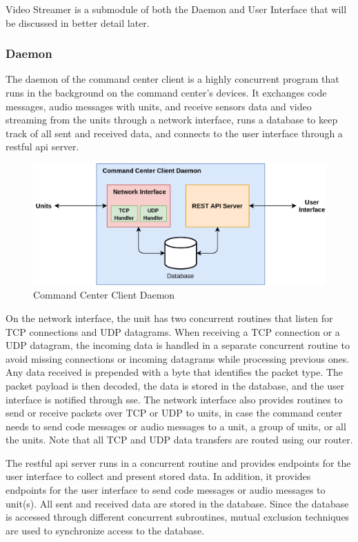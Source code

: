 Video Streamer is a submodule of both the Daemon and User Interface that will be discussed in better detail later.

\subsubsection{Daemon}
The daemon of the command center client is a highly concurrent program that runs in the background on the command center's devices. It exchanges code messages, audio messages with units, and receive sensors data and video streaming from the units through a network interface, runs a database to keep track of all sent and received data, and connects to the user interface through a \acrshort{rest}ful \acrshort{api} server.

\begin{figure}[!htb]
    \centering
    \includegraphics[width=\linewidth]{images/cmd-daemon.png}
    \caption{Command Center Client Daemon}
    \label{fig:cmd-daemon}
\end{figure} 

On the network interface, the unit has two concurrent routines that listen for TCP connections and UDP datagrams. When receiving a TCP connection or a UDP datagram, the incoming data is handled in a separate concurrent routine to avoid missing connections or incoming datagrams while processing previous ones. Any data received is prepended with a byte that identifies the packet type. The packet payload is then decoded, the data is stored in the database, and the user interface is notified through \acrfull{sse}. The network interface also provides routines to send or receive packets over TCP or UDP to units, in case the command center needs to send code messages or audio messages to a unit, a group of units, or all the units. Note that all TCP and UDP data transfers are routed using our router.

The \acrshort{rest}ful \acrshort{api} server runs in a concurrent routine and provides endpoints for the user interface to collect and present stored data. In addition, it provides endpoints for the user interface to send code messages or audio messages to unit(s). All sent and received data are stored in the database. Since the database is accessed through different concurrent subroutines, mutual exclusion techniques are used to synchronize access to the database.

